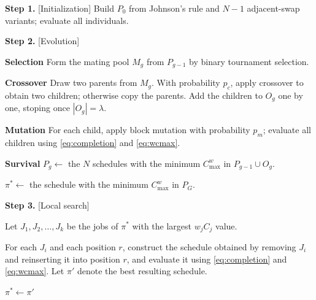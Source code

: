 \documentclass[12pt]{article}
\begin{document}
\begin{sloppypar}
        \begin{algorithm}[H]
            \small
            \linespread{1.2}\selectfont
            \SetAlgoLined
            \DontPrintSemicolon
            \caption{The weight-block genetic algorithm (WBGA) for $F2 \mid \mid C_{\max}^w$} \label{Alg-GA}
            
            \BlankLine
            \textbf{Step 1.} [Initialization] Build $P_0$ from Johnson's rule and $N-1$ adjacent-swap variants; evaluate all individuals. \;
            
            \textbf{Step 2.} [Evolution] 
            {
                \textbf{Selection} Form the mating pool $M_g$ from $P_{g-1}$ by binary tournament selection. \;
                 
                \textbf{Crossover} 
                {
                    Draw two parents from $M_g$. With probability $p_c$, apply crossover to obtain two children; otherwise copy the parents. Add the children to $O_g$ one by one, stoping once $|O_g|=\lambda$. \;
                }
                
                \textbf{Mutation} For each child, apply block mutation with probability $p_m$; evaluate all children using \cref{eq:completion} and \cref{eq:wcmax}. \;
                
                \textbf{Survival} $P_g \gets$ the $N$ schedules with the minimum $C_{\max}^w$ in $P_{g-1}\cup O_g$. \;
            }
            
            $\pi^{*} \gets$ the schedule with the minimum $C_{\max}^w$ in $P_G$. \;
            
            \textbf{Step 3.} [Local search] 
            {
                Let $J_{1}, J_{2}, \ldots, J_{k}$ be the jobs of $\pi^{*}$ with the largest $w_jC_j$ value. \;
                
                For each $J_i$ and each position $r$, construct the schedule obtained by removing $J_i$ and reinserting it into position $r$, and evaluate it using \cref{eq:completion} and \cref{eq:wcmax}. Let $\pi'$ denote the best resulting schedule. \;
                
                {
                  $\pi^{*} \gets \pi'$ \;
                }
            }
        \end{algorithm}
        

\end{sloppypar}
\end{document}
